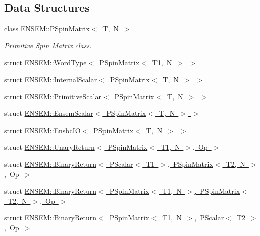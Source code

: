 \subsection*{Data Structures}
\begin{DoxyCompactItemize}
\item 
class \mbox{\hyperlink{classENSEM_1_1PSpinMatrix}{E\+N\+S\+E\+M\+::\+P\+Spin\+Matrix$<$ T, N $>$}}
\begin{DoxyCompactList}\small\item\em Primitive Spin Matrix class. \end{DoxyCompactList}\item 
struct \mbox{\hyperlink{structENSEM_1_1WordType_3_01PSpinMatrix_3_01T1_00_01N_01_4_01_4}{E\+N\+S\+E\+M\+::\+Word\+Type$<$ P\+Spin\+Matrix$<$ T1, N $>$ $>$}}
\item 
struct \mbox{\hyperlink{structENSEM_1_1InternalScalar_3_01PSpinMatrix_3_01T_00_01N_01_4_01_4}{E\+N\+S\+E\+M\+::\+Internal\+Scalar$<$ P\+Spin\+Matrix$<$ T, N $>$ $>$}}
\item 
struct \mbox{\hyperlink{structENSEM_1_1PrimitiveScalar_3_01PSpinMatrix_3_01T_00_01N_01_4_01_4}{E\+N\+S\+E\+M\+::\+Primitive\+Scalar$<$ P\+Spin\+Matrix$<$ T, N $>$ $>$}}
\item 
struct \mbox{\hyperlink{structENSEM_1_1EnsemScalar_3_01PSpinMatrix_3_01T_00_01N_01_4_01_4}{E\+N\+S\+E\+M\+::\+Ensem\+Scalar$<$ P\+Spin\+Matrix$<$ T, N $>$ $>$}}
\item 
struct \mbox{\hyperlink{structENSEM_1_1EnsbcIO_3_01PSpinMatrix_3_01T_00_01N_01_4_01_4}{E\+N\+S\+E\+M\+::\+Ensbc\+I\+O$<$ P\+Spin\+Matrix$<$ T, N $>$ $>$}}
\item 
struct \mbox{\hyperlink{structENSEM_1_1UnaryReturn_3_01PSpinMatrix_3_01T1_00_01N_01_4_00_01Op_01_4}{E\+N\+S\+E\+M\+::\+Unary\+Return$<$ P\+Spin\+Matrix$<$ T1, N $>$, Op $>$}}
\item 
struct \mbox{\hyperlink{structENSEM_1_1BinaryReturn_3_01PScalar_3_01T1_01_4_00_01PSpinMatrix_3_01T2_00_01N_01_4_00_01Op_01_4}{E\+N\+S\+E\+M\+::\+Binary\+Return$<$ P\+Scalar$<$ T1 $>$, P\+Spin\+Matrix$<$ T2, N $>$, Op $>$}}
\item 
struct \mbox{\hyperlink{structENSEM_1_1BinaryReturn_3_01PSpinMatrix_3_01T1_00_01N_01_4_00_01PSpinMatrix_3_01T2_00_01N_01_4_00_01Op_01_4}{E\+N\+S\+E\+M\+::\+Binary\+Return$<$ P\+Spin\+Matrix$<$ T1, N $>$, P\+Spin\+Matrix$<$ T2, N $>$, Op $>$}}
\item 
struct \mbox{\hyperlink{structENSEM_1_1BinaryReturn_3_01PSpinMatrix_3_01T1_00_01N_01_4_00_01PScalar_3_01T2_01_4_00_01Op_01_4}{E\+N\+S\+E\+M\+::\+Binary\+Return$<$ P\+Spin\+Matrix$<$ T1, N $>$, P\+Scalar$<$ T2 $>$, Op $>$}}

\end{DoxyCompactItemize}
